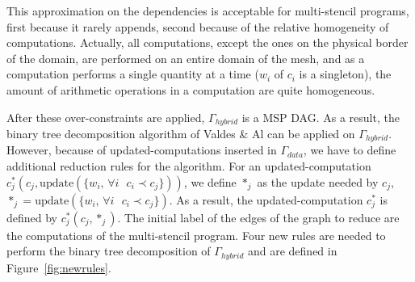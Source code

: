 This approximation on the dependencies is acceptable for multi-stencil programs, first because it rarely appends, second because of the relative homogeneity of computations. Actually, all computations, except the ones on the physical border of the domain, are performed on an entire domain of the mesh, and as a computation performs a single quantity at a time ($w_i$ of $c_i$ is a singleton), the amount of arithmetic operations in a computation are quite homogeneous.

After these over-constraints are applied, $\Gamma_{hybrid}$ is a MSP DAG. As a result, the binary tree decomposition algorithm of Valdes \& Al can be applied on $\Gamma_{hybrid}$. However, because of updated-computations inserted in $\Gamma_{data}$, we have to define additional reduction rules for the algorithm. For an updated-computation $c^*_j(c_j,\text{update}(\{w_i\text{, }\forall i\text{ }c_i \prec c_j\}))$, we define $*_j$ as the update needed by $c_j$, $*_j = \text{update}(\{w_i\text{, }\forall i\text{ }c_i \prec c_j\})$. As a result, the updated-computation $c^*_j$ is defined by $c^*_j(c_j,*_j)$. The initial label of the edges of the graph to reduce are the computations of the multi-stencil program. Four new rules are needed to perform the binary tree decomposition of $\Gamma_{hybrid}$ and are defined in Figure~\ref{fig:newrules}.

